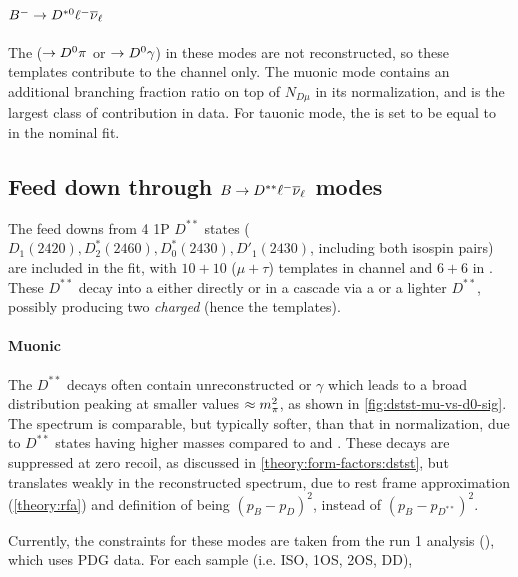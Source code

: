 \paragraph{${{{B}^-}} \rightarrow D^{*0}{\ell^-}{{\overline{\nu}}_\ell}$}
The \Dstarz ($\rightarrow {\ensuremath{{D}^0}} \pi$ or $\rightarrow {\ensuremath{{D}^0}} \gamma$)
in these modes are not reconstructed,
so these templates contribute to the \Dz channel only.
The muonic mode contains an additional branching fraction ratio on top of
$N_{D\mu}$ in its normalization, and is the largest class of contribution
in \Dz data.
For tauonic mode, the \RDstz is set to be equal to \RDstp in the nominal fit.


\subsection{Feed down through $B \rightarrow D^{**}{\ell^-}{{\overline{\nu}}_\ell}$ modes}
\label{tmpl:dstst}

The feed downs from 4 1P $D^{**}$ states
($D_1(2420), D_2^*(2460), D_0^*(2430), D'_1(2430)$, including both isospin
pairs)
are included in the fit, with $10+10$ ($\mu+\tau$) templates in \Dz channel
and $6+6$ in \Dstar.
These $D^{**}$ decay into a \Dz either directly or in a
cascade via a \Dstar or a lighter $D^{**}$,
possibly producing two \emph{charged} \pion
(hence the \Dz\pion\pion templates).

\paragraph{Muonic}
The $D^{**}$ decays often contain unreconstructed \piz or $\gamma$ which leads
to a broad \mmSq distribution peaking at smaller values $\approx m^2_{\pi}$,
as shown in \cref{fig:dstst-mu-vs-d0-sig}.
The \el spectrum is comparable, but typically softer, than that in normalization,
due to $D^{**}$ states having higher masses compared to \Dz and \Dstar.
These decays are suppressed at zero recoil, as discussed in
\cref{theory:form-factors:dstst},
but translates weakly in the reconstructed \qSq spectrum, due to rest frame
approximation (\cref{theory:rfa}) and definition of \qSq being
$(p_B - p_D)^2$, instead of $(p_B - p_{D^{**}})^2$.

Currently, the constraints for these modes are
taken from the run 1 analysis (\cite{LHCb-ANA-2020-056}), which uses PDG data.
For each sample (i.e. ISO, 1OS, 2OS, DD),


